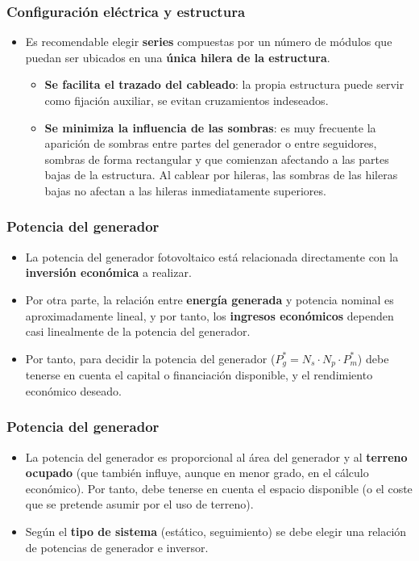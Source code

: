 \documentclass[xcolor=dvipsnames]{beamer}
\begin{document}
\begin{frame}
\frametitle{Configuración eléctrica y estructura}
\begin{itemize}
\item Es recomendable elegir \textbf{series} compuestas por un número de
módulos que puedan ser ubicados en una \textbf{única hilera de la
estructura}. 

\begin{itemize}
\item \textbf{Se facilita el trazado del cableado}: la propia estructura
puede servir como fijación auxiliar, se evitan cruzamientos indeseados.
\item \textbf{Se minimiza la influencia de las sombras}: es muy frecuente
la aparición de sombras entre partes del generador o entre seguidores,
sombras de forma rectangular y que comienzan afectando a las partes
bajas de la estructura. Al cablear por hileras, las sombras de las
hileras bajas no afectan a las hileras inmediatamente superiores.
\end{itemize}
\end{itemize}

\end{frame}

\begin{frame}
\frametitle{Potencia del generador}
\begin{itemize}
\item La potencia del generador fotovoltaico está relacionada directamente
con la \textbf{inversión económica} a realizar. 
\item Por otra parte, la relación entre \textbf{energía generada} y potencia
nominal es aproximadamente lineal, y por tanto, los \textbf{ingresos
económicos} dependen casi linealmente de la potencia del generador. 
\item Por tanto, para decidir la potencia del generador ($P_{g}^{*}=N_{s}\cdot N_{p}\cdot P_{m}^{*}$)
debe tenerse en cuenta el capital o financiación disponible, y el
rendimiento económico deseado.
\end{itemize}

\end{frame}

\begin{frame}
\frametitle{Potencia del generador}
\begin{itemize}
\item La potencia del generador es proporcional al área del generador y
al \textbf{terreno ocupado }(que también influye, aunque en menor
grado, en el cálculo económico). Por tanto, debe tenerse en cuenta
el espacio disponible (o el coste que se pretende asumir por el uso
de terreno).
\item Según el \textbf{tipo de sistema} (estático, seguimiento) se debe
elegir una relación de potencias de generador e inversor.
\end{itemize}

\end{frame}
\end{document}
